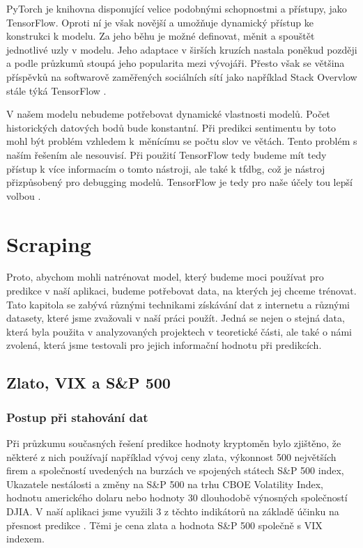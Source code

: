 PyTorch je knihovna disponující velice podobnými schopnostmi a přístupy, jako TensorFlow. 
Oproti ní je však novější a umožňuje dynamický přístup ke konstrukci k modelu. 
Za jeho běhu je možné definovat, měnit a spouštět jednotlivé uzly v modelu. 
Jeho adaptace v širších kruzích nastala poněkud později a podle průzkumů stoupá jeho popularita mezi vývojáři. 
Přesto však se většina příspěvků na softwarově zaměřených sociálních sítí jako například Stack Overvlow stále týká TensorFlow \cite{pytorch}.

V našem modelu nebudeme potřebovat dynamické vlastnosti modelů. Počet historických datových bodů bude konstantní. 
Při predikci sentimentu by toto mohl být problém vzhledem k~měnícímu se počtu slov ve větách. 
Tento problém s naším řešením ale nesouvisí. 
Při použití TensorFlow tedy budeme mít tedy přístup k více informacím o tomto nástroji, ale také k tfdbg, což je nástroj přizpůsobený pro debugging modelů.
TensorFlow je tedy pro naše účely tou lepší volbou \cite{pytorch-vs-tensorflow}.

\chapter{Scraping}

Proto, abychom mohli natrénovat model, který budeme moci používat pro predikce v naší aplikaci, budeme potřebovat data, na kterých jej chceme trénovat.
Tato kapitola se zabývá různými technikami získávání dat z internetu a různými datasety, které jsme zvažovali v naší práci použít.
Jedná se nejen o stejná data, která byla použita v analyzovaných projektech v teoretické části, ale také o námi zvolená, která jsme testovali pro jejich informační hodnotu při predikcích.

\section{Zlato, VIX a S\&P 500}

\subsection{Postup při stahování dat}

Při průzkumu současných řešení predikce hodnoty kryptoměn bylo zjištěno, že některé z nich používají například vývoj ceny zlata, výkonnost 500 největších firem a společností uvedených na burzách ve spojených státech S\&P 500 index, Ukazatele nestálosti a změny na S\&P 500 na trhu CBOE Volatility Index, hodnotu amerického dolaru nebo hodnoty 30 dlouhodobě výnosných společností DJIA. 
V naší aplikaci jsme využili 3 z těchto indikátorů na základě účinku na přesnost predikce \cite{sap, vix, djia}. Těmi je cena zlata a hodnota S\&P 500 společně s VIX indexem.

